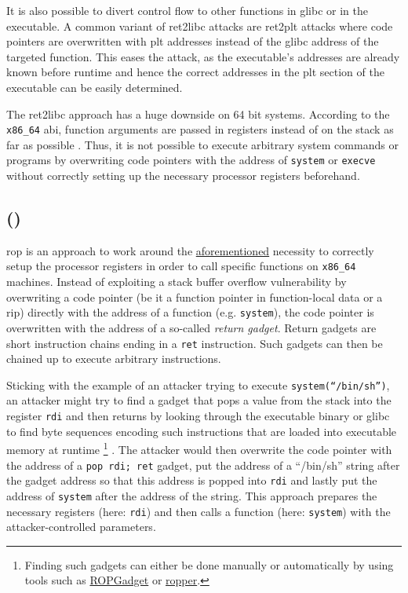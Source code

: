 It is also possible to divert control flow to other functions in \gls{glibc} or in the executable.
A common variant of \gls{ret2libc} attacks are \gls{ret2plt} attacks where code pointers are overwritten with \gls{plt} addresses instead of the \gls{glibc} address of the targeted function.
This eases the attack, as the executable's addresses are already known before runtime and hence the correct addresses in the \gls{plt} section of the executable can be easily determined.

The \gls{ret2libc} approach has a huge downside on 64 bit systems.
According to the \texttt{x86\_64} \gls{abi}, function arguments are passed in registers instead of on the stack as far as possible \cites[19\psqq]{Lu2018}[17\psqq]{Fog2019}.
Thus, it is not possible to execute arbitrary system commands or programs by overwriting code pointers with the address of \texttt{system} or \texttt{execve} without correctly setting up the necessary processor registers beforehand.


\subsection{ ()}
\label{subsec:cr-rop}

\gls{rop} is an approach to work around the \hyperref[subsec:cr-ret2libc]{aforementioned} necessity to correctly setup the processor registers in order to call specific functions on \texttt{x86\_64} machines.
Instead of exploiting a stack buffer overflow vulnerability by overwriting a code pointer (be it a function pointer in function-local data or a \gls{rip}) directly with the address of a function (e.g. \texttt{system}), the code pointer is overwritten with the address of a so-called \emph{return gadget}.
Return gadgets are short instruction chains ending in a \texttt{ret} instruction.
Such gadgets can then be chained up to execute arbitrary instructions.

Sticking with the example of an attacker trying to execute \texttt{system(``/bin/sh'')}, an attacker might try to find a gadget that pops a value from the stack into the register \texttt{rdi} and then returns by looking through the executable binary or \gls{glibc} to find byte sequences encoding such instructions that are loaded into executable memory at runtime%
	\footnote{Finding such gadgets can either be done manually or automatically by using tools such as \href{https://github.com/JonathanSalwan/ROPgadget}{ROPGadget} or \href{https://github.com/sashs/Ropper}{ropper}.}%
.
The attacker would then overwrite the code pointer with the address of a \texttt{pop rdi; ret} gadget, put the address of a ``/bin/sh'' string after the gadget address so that this address is popped into \texttt{rdi} and lastly put the address of \texttt{system} after the address of the string.
This approach prepares the necessary registers (here: \texttt{rdi}) and then calls a function (here: \texttt{system}) with the attacker-controlled parameters.

